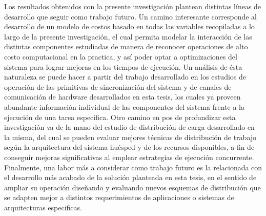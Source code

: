 \begin{conclusion}
Los resultados obtenidos con la presente investigación plantean distintas líneas de desarrollo que seguir como trabajo futuro. Un camino interesante corresponde al desarrollo de un modelo de costos basado en todas las variables recopiladas a lo largo de la presente investigación, el cual permita modelar la interacción de las distintas componentes estudiadas de manera de reconocer operaciones de alto costo computacional en la practica, y así poder optar a optimizaciones del sistema para lograr mejoras en los tiempos de ejecución. Un análisis de ésta naturaleza se puede hacer a partir del trabajo desarrollado en los estudios de operación de las primitivas de sincronización del sistema y de canales de comunicación de hardware desarrollados en esta tesis, los cuales ya proveen abundante información individual de las componentes del sistema frente a la ejecución de una tarea especifica. Otro camino en pos de profundizar esta investigación va de la mano del estudio de distribución de carga desarrollado en la misma, del cual se pueden evaluar mejores técnicas de distribución de trabajo según la arquitectura del sistema huésped y de los recursos disponibles, a fin de conseguir mejoras significativas al emplear estrategias de ejecución concurrente. Finalmente, una labor más a considerar como trabajo futuro es la relacionada con el desarrollo más acabado de la solución planteada en esta tesis, en el sentido de ampliar su operación diseñando y evaluando nuevos esquemas de distribución que se adapten mejor a distintos requerimientos de aplicaciones o sistemas de arquitecturas especificas.

\end{conclusion}